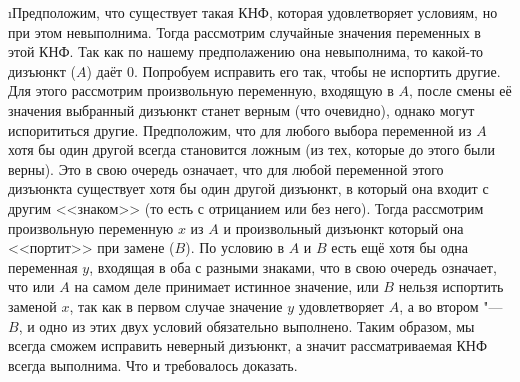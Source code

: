 \i Предположим, что существует такая КНФ, которая удовлетворяет условиям, но при этом невыполнима. Тогда рассмотрим случайные значения переменных в этой КНФ. Так как по нашему предполажению она невыполнима, то какой-то дизъюнкт ($A$) даёт 0. Попробуем исправить его так, чтобы не испортить другие. Для этого рассмотрим произвольную переменную, входящую в $A$, после смены её значения выбранный дизъюнкт станет верным (что очевидно), однако могут испорититься другие. Предположим, что для любого выбора переменной из $A$ хотя бы один другой всегда становится ложным (из тех, которые до этого были верны). Это в свою очередь означает, что для любой переменной этого дизъюнкта существует хотя бы один другой дизъюнкт, в который она входит с другим <<знаком>> (то есть с отрицанием или без него). Тогда рассмотрим произвольную переменную $x$ из $A$ и произвольный дизъюнкт который она <<портит>> при замене ($B$). По условию в $A$ и $B$ есть ещё хотя бы одна переменная $y$, входящая в оба с разными знаками, что в свою очередь означает, что или $A$ на самом деле принимает истинное значение, или $B$ нельзя испортить заменой $x$, так как в первом случае значение $y$ удовлетворяет $A$, а во втором "--- $B$, и одно из этих двух условий обязательно выполнено. Таким образом, мы всегда сможем исправить неверный дизъюнкт, а значит рассматриваемая КНФ всегда выполнима. Что и требовалось доказать.